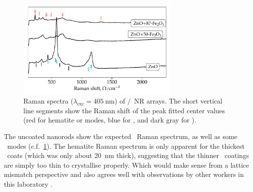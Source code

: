 \documentclass[draft,webedition,openright,titles,swedish,english]{LuaUUThesis}\usepackage[]{graphicx}\usepackage[]{xcolor}
\newenvironment{knitrout}{}{} %
\newcommand{\cf}{c.f.}
\begin{document}
%















\begin{figure}[tbp]
\centering
\begin{knitrout}\scriptsize
{}\color{fgcolor}

{\centering \includegraphics[width=3.12in]{figure/0503P-fig-Raman-405nm-stacked-1} 

}


\end{knitrout}
\caption[Raman spectra of \zincox/\ironox\ nanorod arrays]{%
   Raman spectra ($\lambda_\text{exc}=\qty{405}{\nm}$) of
   \zincox/\ironox\ \protect\gls{NR} arrays.
   The short vertical line segments show the Raman shift of the peak fitted
   center values (red for hematite or  modes, blue for \ZnO,
   and dark gray for \tinox).}
\label{fig:P03-Raman-405nm-stacked}
\end{figure}

The uncoated nanorods show the expected \ZnO\ Raman spectrum, as well as some
\tinox\ modes (\cf\ \cref{fig:P03-Raman-405nm-stacked}).
The hematite Raman spectrum is only apparent for the thickest \ironox\ coats
(which was only about \qty{20}{\nm} thick),
suggesting that the thinner \ironox\ coatings are simply too thin to crystallise
properly. Which would make sense from a lattice mismatch perspective and also
agrees well with observations by other workers in this laboratory \cite{Fondell2014,Jogi2015}.

%
\end{document}
